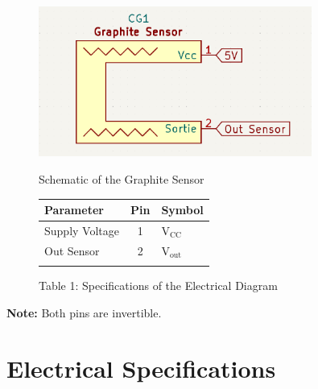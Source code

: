 \documentclass[10pt]{datasheet}
\begin{document}
\begin{figure}[h!]
    \begin{minipage}[ts]{.47\linewidth}
        \centering
        \captionsetup{justification=centering}
        \includegraphics[width=0.8\textwidth]{Cover/ElectricDiagramSensor.png}
        \caption{\small{Schematic of the Graphite Sensor}}
    \end{minipage}
    \begin{minipage}[b]{.45\linewidth}
        \centering
        \caption*{Table 1: Specifications of the Electrical Diagram}
            \begin{tabularx}{\textwidth}{l | c | X}
                \thickhline
                \textbf{Parameter} & \textbf{Pin} & \textbf{Symbol} \\
                \hline
                Supply Voltage & 1 & V$_{\text{CC}}$ \\ 
                \hline
                Out Sensor & 2 & V$_{\text{out}}$ \\
                \thickhline
            \end{tabularx}
    \end{minipage}
\end{figure}

\textbf{Note:} Both pins are invertible.

\setcounter{table}{1}

\section{Electrical Specifications}
\end{document}
